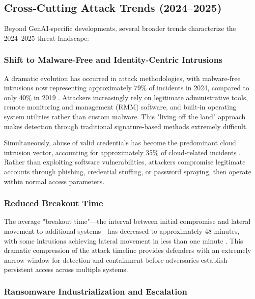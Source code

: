 \subsection{Cross-Cutting Attack Trends (2024–2025)}

Beyond GenAI-specific developments, several broader trends characterize the 2024–2025 threat landscape:

\subsubsection{Shift to Malware-Free and Identity-Centric Intrusions}

A dramatic evolution has occurred in attack methodologies, with malware-free intrusions now representing approximately 79\% of incidents in 2024, compared to only 40\% in 2019 \cite{crowdstrike2024}. Attackers increasingly rely on legitimate administrative tools, remote monitoring and management (RMM) software, and built-in operating system utilities rather than custom malware. This "living off the land" approach makes detection through traditional signature-based methods extremely difficult.

Simultaneously, abuse of valid credentials has become the predominant cloud intrusion vector, accounting for approximately 35\% of cloud-related incidents \cite{crowdstrike2024}. Rather than exploiting software vulnerabilities, attackers compromise legitimate accounts through phishing, credential stuffing, or password spraying, then operate within normal access parameters.

\subsubsection{Reduced Breakout Time}

The average "breakout time"—the interval between initial compromise and lateral movement to additional systems—has decreased to approximately 48 minutes, with some intrusions achieving lateral movement in less than one minute \cite{crowdstrike2024}. This dramatic compression of the attack timeline provides defenders with an extremely narrow window for detection and containment before adversaries establish persistent access across multiple systems.

\subsubsection{Ransomware Industrialization and Escalation}

